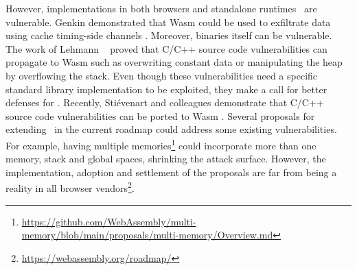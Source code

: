 However, implementations in both browsers and standalone runtimes~\cite{Narayan2021Swivel} are vulnerable.
Genkin \etal demonstrated that Wasm  could be used to exfiltrate data using cache timing-side channels \cite{Genkin2018DrivebyKC}.
Moreover, binaries itself can be vulnerable. The work of Lehmann \etal ~\cite{usenixWasm2020} proved that C/C++ source code vulnerabilities can propagate to Wasm  such as overwriting constant data or manipulating the heap by overflowing the stack. Even though these vulnerabilities need a specific standard library implementation to be exploited, they make a call for better defenses for \wasm. 
Recently, Stiévenart and colleagues demonstrate that C/C++ source code vulnerabilities can be ported to Wasm \cite{DeRoover2022}.
Several proposals for extending \wasm\ in the current roadmap could address some existing vulnerabilities. For example, having multiple memories\footnote{\url{https://github.com/WebAssembly/multi-memory/blob/main/proposals/multi-memory/Overview.md}} could incorporate more than one memory, stack and global spaces, shrinking the attack surface. However, the implementation, adoption and settlement of the proposals are far from being a reality in all browser vendors\footnote{\url{https://webassembly.org/roadmap/}}. 
